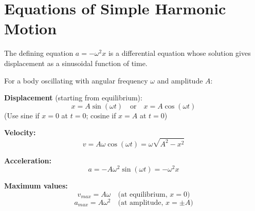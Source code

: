 \section{Equations of Simple Harmonic Motion}

The defining equation $a = -\omega^2 x$ is a
differential equation whose solution gives displacement
as a sinusoidal function of time.

\begin{lawbox}
For a body oscillating with angular frequency $\omega$
and amplitude $A$:

\textbf{Displacement} (starting from equilibrium):
\[
  x = A\sin(\omega t) \quad \text{or} \quad
  x = A\cos(\omega t)
\]
(Use sine if $x=0$ at $t=0$; cosine if $x=A$ at $t=0$)

\textbf{Velocity:}
\[
  v = A\omega\cos(\omega t)
  = \omega\sqrt{A^2 - x^2}
\]

\textbf{Acceleration:}
\[
  a = -A\omega^2\sin(\omega t) = -\omega^2 x
\]

\textbf{Maximum values:}
\[
  v_{max} = A\omega \quad \text{(at equilibrium, } x=0\text{)}
\]
\[
  a_{max} = A\omega^2 \quad \text{(at amplitude, } x=\pm A\text{)}
\]
\end{lawbox}

